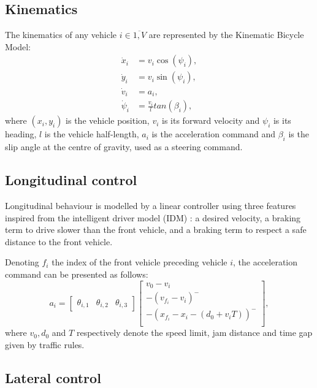 \documentclass{article}
\begin{document}
\subsection{Kinematics}

The kinematics of any vehicle $i\in\overline{1,V}$ are represented by the Kinematic Bicycle Model:
\begin{align}
	\dot{x}_i &= v_i\cos(\psi_i), \nonumber\\
	\dot{y}_i &= v_i\sin(\psi_i), \nonumber\\
	\dot{v}_i &= a_i, \nonumber\\
	\dot{\psi}_i &= \frac{v_i}{l}tan(\beta_i), \nonumber
\end{align}
where $(x_i, y_i)$ is the vehicle position, $v_i$ is its forward velocity and $\psi_i$ is its heading, $l$ is the vehicle half-length, $a_i$ is the acceleration command and $\beta_i$ is the slip angle at the centre of gravity, used as a steering command.

\subsection{Longitudinal control}
Longitudinal behaviour is modelled by a linear controller using three features inspired from the intelligent driver model (IDM) \cite{Treiber2000}: a desired velocity, a braking term to drive slower than the front vehicle, and a braking term to respect a safe distance to the front vehicle.

Denoting $f_i$ the index of the front vehicle preceding vehicle $i$, the acceleration command can be presented as follows:
\begin{equation*}
	a_i = \begin{bmatrix}
	\theta_{i,1} & \theta_{i,2} & \theta_{i,3}
	\end{bmatrix} \begin{bmatrix}
		v_0 - v_i \\
		-(v_{f_i}-v_i)^- \\
		-(x_{f_i} - x_i - (d_0 + v_iT))^- \\
	\end{bmatrix},
	\label{eq:theta_a}
\end{equation*}
where $v_0, d_0$ and $T$ respectively denote the speed limit, jam distance and time gap given by traffic rules.

\subsection{Lateral control}
\end{document}
